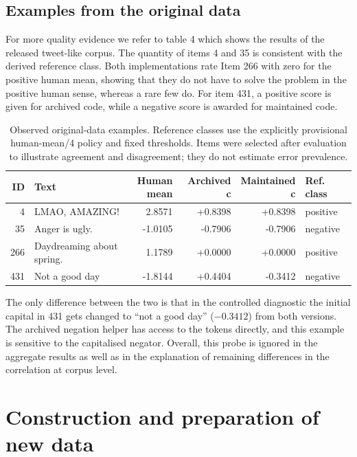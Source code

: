 \documentclass[11pt]{article}
\begin{document}
\subsection{Examples from the original data}

For more quality evidence we refer to table 4 which shows the results of the released tweet-like corpus. The quantity of items 4 and 35 is consistent with the derived reference class. Both implementations rate Item 266 with zero for the positive human mean, showing that they do not have to solve the problem in the positive human sense, whereas a rare few do. For item 431, a positive score is given for archived code, while a negative score is awarded for maintained code.


\begin{table}[t]
\centering\small
\setlength{\tabcolsep}{5pt}
\begin{tabular}{@{}rlrrrl@{}}
\toprule
ID & Text & \shortstack{Human\\mean} & Archived c & \shortstack{Maintained\\c} & Ref. class\\
\midrule
4 & LMAO, AMAZING! & 2.8571 & +0.8398 & +0.8398 & positive\\
35 & Anger is ugly. & -1.0105 & -0.7906 & -0.7906 & negative\\
266 & Daydreaming about spring. & 1.1789 & +0.0000 & +0.0000 & positive\\
431 & Not a good day & -1.8144 & +0.4404 & -0.3412 & negative\\
\bottomrule
\end{tabular}
\caption{Observed original-data examples. Reference classes use the explicitly provisional human-mean/4 policy and fixed thresholds. Items were selected after evaluation to illustrate agreement and disagreement; they do not estimate error prevalence.}
\label{tab:user4}
\end{table}

The only difference between the two is that in the controlled diagnostic the initial capital in 431 gets changed to ``not a good day'' ($-0.3412$) from both versions. The archived negation helper has access to the tokens directly, and this example is sensitive to the capitalised negator. Overall, this probe is ignored in the aggregate results as well as in the explanation of remaining differences in the correlation at corpus level.


\section{Construction and preparation of new data}
\end{document}
